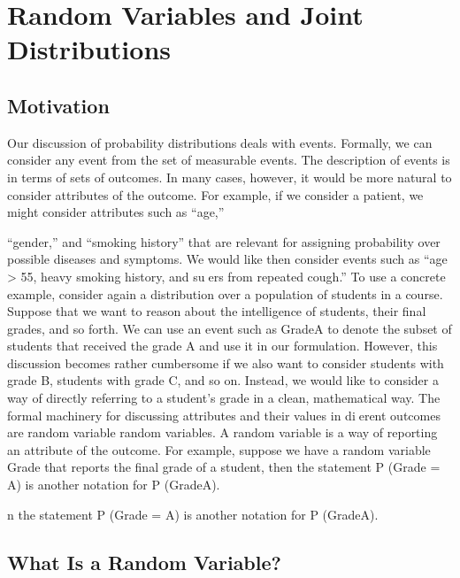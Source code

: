 \section{Random Variables and Joint Distributions}

\subsection{Motivation}

Our discussion of probability distributions deals with events. Formally, we can consider any event from the set of measurable events. The description of events is in terms of sets of outcomes. In many cases, however, it would be more natural to consider attributes of the outcome. For example, if we consider a patient, we might consider attributes such as “age,”

“gender,” and “smoking history” that are relevant for assigning probability over possible diseases and symptoms. We would like then consider events such as “age > 55, heavy smoking history, and suers from repeated cough.” To use a concrete example, consider again a distribution over a population of students in a course. Suppose that we want to reason about the intelligence of students, their final grades, and so forth. We can use an event such as GradeA to denote the subset of students that received the grade A and use it in our formulation. However, this discussion becomes rather cumbersome if we also want to consider students with grade B, students with grade C, and so on. Instead, we would like to consider a way of directly referring to a student’s grade in a clean, mathematical way. The formal machinery for discussing attributes and their values in dierent outcomes are random variable random variables. A random variable is a way of reporting an attribute of the outcome. For example, suppose we have a random variable Grade that reports the final grade of a student, then the statement P (Grade = A) is another notation for P (GradeA).

n the statement P (Grade = A) is another notation for P (GradeA).

\subsection{What Is a Random Variable?}

